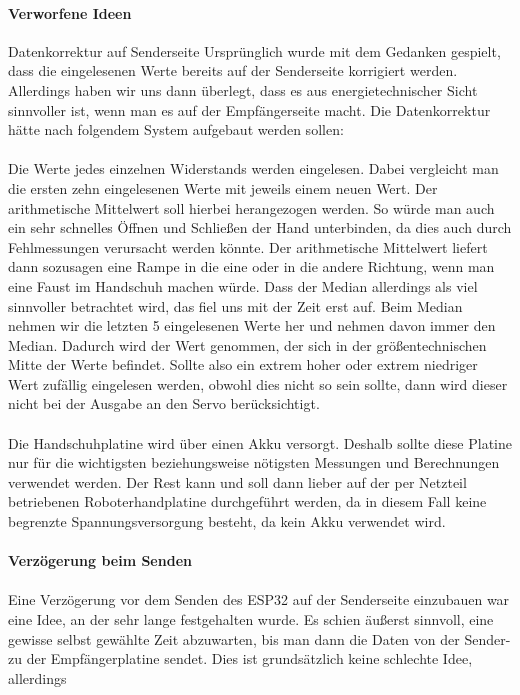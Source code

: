 \documentclass[titlepage,12pt,twoside]{article}
\begin{document}
\paragraph{Verworfene Ideen}
\hfill \break
\hfill \break
Datenkorrektur auf Senderseite
Ursprünglich wurde mit dem Gedanken gespielt, dass die eingelesenen Werte bereits auf der Senderseite korrigiert werden. 
Allerdings haben wir uns dann überlegt, dass es aus energietechnischer Sicht sinnvoller ist, wenn man es auf der Empfängerseite 
macht. Die Datenkorrektur hätte nach folgendem System aufgebaut werden sollen: \\
\\
Die Werte jedes einzelnen Widerstands werden eingelesen. Dabei vergleicht man die ersten zehn eingelesenen Werte mit jeweils 
einem neuen Wert. Der arithmetische Mittelwert soll hierbei herangezogen werden. So würde man auch ein sehr schnelles Öffnen 
und Schließen der Hand unterbinden, da dies auch durch Fehlmessungen verursacht werden könnte. Der arithmetische Mittelwert 
liefert dann sozusagen eine Rampe in die eine oder in die andere Richtung, wenn man eine Faust im Handschuh machen würde. Dass 
der Median allerdings als viel sinnvoller betrachtet wird, das fiel uns mit der Zeit erst auf. Beim Median nehmen wir die 
letzten 5 eingelesenen Werte her und nehmen davon immer den Median. Dadurch wird der Wert genommen, der sich in der 
größentechnischen Mitte der Werte befindet. Sollte also ein extrem hoher oder extrem niedriger Wert zufällig eingelesen werden, 
obwohl dies nicht so sein sollte, dann wird dieser nicht bei der Ausgabe an den Servo berücksichtigt. \\
\\
Die Handschuhplatine wird über einen Akku versorgt. Deshalb sollte diese Platine nur für die wichtigsten beziehungsweise 
nötigsten Messungen und Berechnungen verwendet werden. Der Rest kann und soll dann lieber auf der per Netzteil betriebenen 
Roboterhandplatine durchgeführt werden, da in diesem Fall keine begrenzte Spannungsversorgung besteht, da kein Akku verwendet 
wird. \\
\\
\textbf{Verzögerung beim Senden} \\
\\
Eine Verzögerung vor dem Senden des ESP32 auf der Senderseite einzubauen war eine 
Idee, an der sehr lange festgehalten wurde. Es schien äußerst sinnvoll, eine 
gewisse selbst gewählte Zeit abzuwarten, bis man dann die Daten von der Sender- zu 
der Empfängerplatine sendet. Dies ist grundsätzlich keine schlechte Idee, allerdings 
\end{document}
